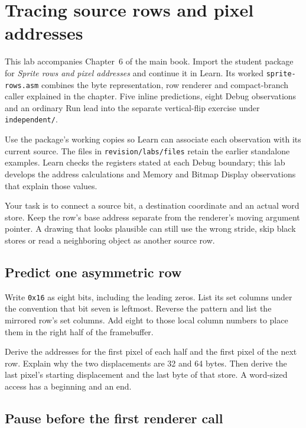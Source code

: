 \chapter{Tracing source rows and pixel addresses}
\label{revision:lab-arrays}

This lab accompanies Chapter~6 of the main book. Import the student package for
\emph{Sprite rows and pixel addresses} and continue it in Learn. Its worked
\texttt{sprite-rows.asm} combines the byte representation, row renderer and
compact-branch caller explained in the chapter. Five inline predictions, eight
Debug observations and an ordinary Run lead into the separate vertical-flip
exercise under \texttt{independent/}.

Use the package's working copies so Learn can associate each observation with
its current source. The files in \texttt{revision/labs/files} retain the earlier
standalone examples. Learn checks the registers stated at each Debug boundary;
this lab develops the address calculations and Memory and Bitmap Display
observations that explain those values.

Your task is to connect a source bit, a destination coordinate and an actual word
store. Keep the row's base address separate from the renderer's moving argument
pointer. A drawing that looks plausible can still use the wrong stride, skip
black stores or read a neighboring object as another source row.

\section{Predict one asymmetric row}

Write \texttt{0x16} as eight bits, including the leading zeros. List its set
columns under the convention that bit seven is leftmost. Reverse the pattern and
list the mirrored row's set columns. Add eight to those local column numbers to
place them in the right half of the framebuffer.

Derive the addresses for the first pixel of each half and the first pixel of the
next row. Explain why the two displacements are 32 and 64 bytes. Then derive the
last pixel's starting displacement and the last byte of that store. A word-sized
access has a beginning and an end.

\section{Pause before the first renderer call}

